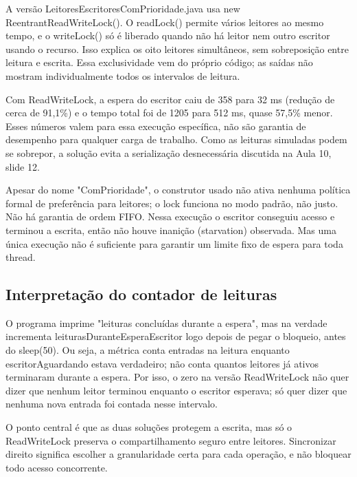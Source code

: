 \documentclass[11pt,a4paper]{article}
\newcommand{\code}[1]{{\small\ttfamily #1}}
\begin{document}
A versão \code{Leitores\allowbreak{}Escritores\allowbreak{}Com\allowbreak{}Prioridade.\allowbreak{}java} usa \code{new Reentrant\allowbreak{}Read\allowbreak{}Write\allowbreak{}Lock(\allowbreak{})}. O \code{read\allowbreak{}Lock(\allowbreak{})} permite vários leitores ao mesmo tempo, e o \code{write\allowbreak{}Lock(\allowbreak{})} só é liberado quando não há leitor nem outro escritor usando o recurso. Isso explica os oito leitores simultâneos, sem sobreposição entre leitura e escrita. Essa exclusividade vem do próprio código; as saídas não mostram individualmente todos os intervalos de leitura.

Com \code{Read\allowbreak{}Write\allowbreak{}Lock}, a espera do escritor caiu de 358 para 32 ms (redução de cerca de 91,1\%) e o tempo total foi de 1205 para 512 ms, quase 57,5\% menor. Esses números valem para essa execução específica, não são garantia de desempenho para qualquer carga de trabalho. Como as leituras simuladas podem se sobrepor, a solução evita a serialização desnecessária discutida na Aula 10, slide 12.

Apesar do nome "\code{Com\allowbreak{}Prioridade}", o construtor usado não ativa nenhuma política formal de preferência para leitores; o lock funciona no modo padrão, não justo. Não há garantia de ordem FIFO. Nessa execução o escritor conseguiu acesso e terminou a escrita, então não houve inanição (starvation) observada. Mas uma única execução não é suficiente para garantir um limite fixo de espera para toda thread.

\subsection*{Interpretação do contador de leituras}
O programa imprime "leituras concluídas durante a espera", mas na verdade incrementa \code{leituras\allowbreak{}Durante\allowbreak{}Espera\allowbreak{}Escritor} logo depois de pegar o bloqueio, antes do \code{sleep(\allowbreak{}50)}. Ou seja, a métrica conta entradas na leitura enquanto \code{escritor\allowbreak{}Aguardando} estava verdadeiro; não conta quantos leitores já ativos terminaram durante a espera. Por isso, o zero na versão \code{Read\allowbreak{}Write\allowbreak{}Lock} não quer dizer que nenhum leitor terminou enquanto o escritor esperava; só quer dizer que nenhuma nova entrada foi contada nesse intervalo.

O ponto central é que as duas soluções protegem a escrita, mas só o \code{Read\allowbreak{}Write\allowbreak{}Lock} preserva o compartilhamento seguro entre leitores. Sincronizar direito significa escolher a granularidade certa para cada operação, e não bloquear todo acesso concorrente.
\end{document}
